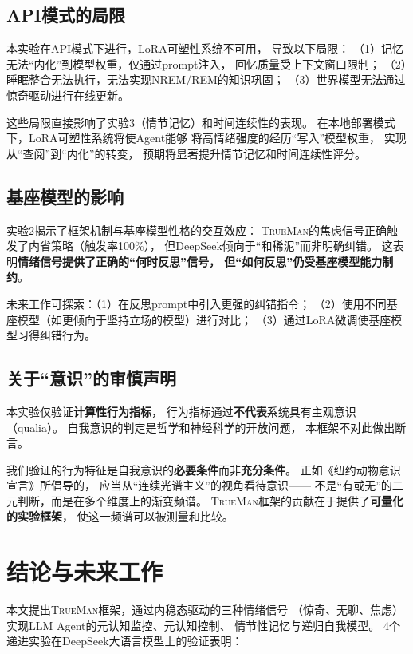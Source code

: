 \documentclass[11pt,a4paper]{article}
\newcommand{\TrueMan}{\textsc{TrueMan}}
\begin{document}
\subsection{API模式的局限}

本实验在API模式下进行，LoRA可塑性系统不可用，
导致以下局限：
（1）记忆无法``内化''到模型权重，仅通过prompt注入，
回忆质量受上下文窗口限制；
（2）睡眠整合无法执行，无法实现NREM/REM的知识巩固；
（3）世界模型无法通过惊奇驱动进行在线更新。

这些局限直接影响了实验3（情节记忆）和时间连续性的表现。
在本地部署模式下，LoRA可塑性系统将使Agent能够
将高情绪强度的经历``写入''模型权重，
实现从``查阅''到``内化''的转变，
预期将显著提升情节记忆和时间连续性评分。

\subsection{基座模型的影响}

实验2揭示了框架机制与基座模型性格的交互效应：
\TrueMan{}的焦虑信号正确触发了内省策略（触发率100\%），
但DeepSeek倾向于``和稀泥''而非明确纠错。
这表明\textbf{情绪信号提供了正确的``何时反思''信号，
但``如何反思''仍受基座模型能力制约}。

未来工作可探索：（1）在反思prompt中引入更强的纠错指令；
（2）使用不同基座模型（如更倾向于坚持立场的模型）进行对比；
（3）通过LoRA微调使基座模型习得纠错行为。

\subsection{关于``意识''的审慎声明}

本实验仅验证\textbf{计算性行为指标}，
行为指标通过\textbf{不代表}系统具有主观意识（qualia）。
自我意识的判定是哲学和神经科学的开放问题，
本框架不对此做出断言。

我们验证的行为特征是自我意识的\textbf{必要条件}而非\textbf{充分条件}。
正如《纽约动物意识宣言》所倡导的，
应当从``连续光谱主义''的视角看待意识——
不是``有或无''的二元判断，而是在多个维度上的渐变频谱。
\TrueMan{}框架的贡献在于提供了\textbf{可量化的实验框架}，
使这一频谱可以被测量和比较。

\section{结论与未来工作}

本文提出\TrueMan{}框架，通过内稳态驱动的三种情绪信号
（惊奇、无聊、焦虑）实现LLM Agent的元认知监控、元认知控制、
情节性记忆与递归自我模型。
4个递进实验在DeepSeek大语言模型上的验证表明：
\end{document}
